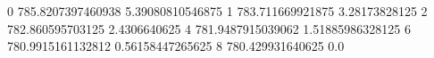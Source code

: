 0 785.8207397460938 5.39080810546875
1 783.711669921875 3.28173828125
2 782.860595703125 2.4306640625
4 781.9487915039062 1.51885986328125
6 780.9915161132812 0.56158447265625
8 780.429931640625 0.0
